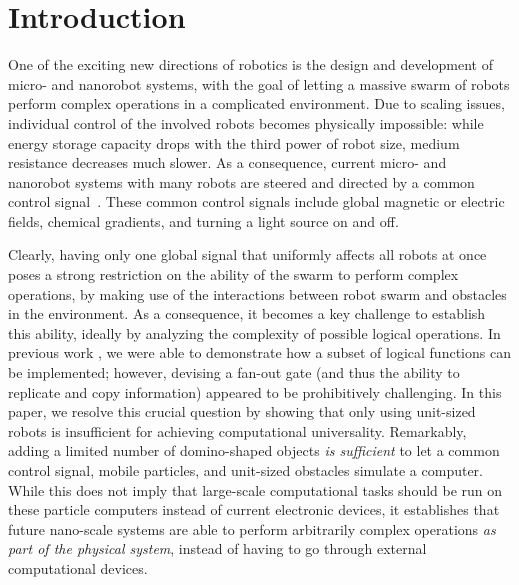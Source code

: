 \documentclass[letterpaper, 10 pt, conference]{ieeeconf}
\begin{document}

\section{Introduction}

One of the exciting new directions of robotics is the design and development
of micro- and nanorobot systems, with the goal of letting a massive swarm of robots
perform complex operations in a complicated environment. Due to scaling 
issues, individual control of the involved robots becomes physically impossible:
while energy storage capacity drops with the third power of robot size,
medium resistance decreases much slower. As a consequence,
current micro- and nanorobot systems with many robots are steered and
directed by a common control 
signal~\cite{Donald2013,Chiang2011,Hsi-Wen2012,Diller2013,Jing2013,Ou2013,Lanauze2013}.
These common control signals include global magnetic or electric fields,
chemical gradients, and turning a light source on and off.  

Clearly, having only one global signal that uniformly affects all robots at once
poses a strong restriction on the ability of the swarm to perform complex operations,
by making use of the interactions between robot swarm and obstacles in the environment.  %
As a consequence, it becomes a key challenge to establish this ability, ideally by
analyzing the complexity of possible logical operations. In previous work \cite{Becker2013f,Becker2014,Becker2014a},
we were able to demonstrate how a subset of logical functions can be implemented;
however, devising a fan-out gate (and thus the ability to replicate and copy information)
appeared to be prohibitively challenging. In this paper, we resolve this crucial question by
showing that only using unit-sized robots is insufficient for achieving computational
universality. Remarkably, adding a limited number of domino-shaped objects {\em is sufficient}
to let a common control signal, mobile particles, and unit-sized obstacles
simulate a computer. While this does not imply that large-scale computational 
tasks should be run on these particle computers instead of current electronic
devices, it establishes that future nano-scale systems are able to perform
arbitrarily complex operations {\em as part of the physical system}, instead
of having to go through external computational devices.
\end{document}
